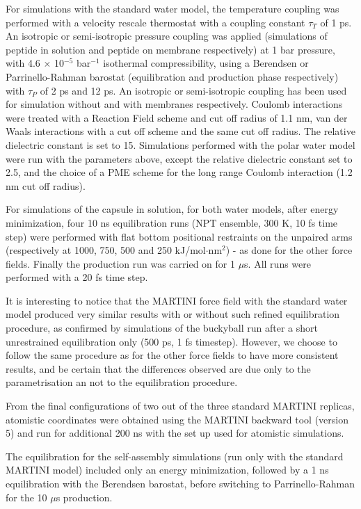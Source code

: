 For simulations with the standard water model, the temperature coupling was performed with a velocity rescale thermostat \citep{Bussi2007} with a coupling constant $\tau _T$ of 1 ps. An isotropic or semi-isotropic pressure coupling was applied (simulations of peptide in solution and peptide on membrane respectively) at 1 bar pressure, with 4.6 $\times$ 10$^{-5}$ bar$^{-1}$ isothermal compressibility, using a Berendsen \citep{Berendsen1984} or Parrinello-Rahman barostat \citep{Parrinello1981} (equilibration and production phase respectively) with $\tau _P$ of 2 ps and 12 ps. An isotropic or semi-isotropic coupling has been used for simulation without and with membranes respectively.
%
Coulomb interactions were treated with a Reaction Field scheme \citep{Tironi1995} and cut off radius of 1.1 nm, van der Waals interactions with a cut off scheme and the same cut off radius. The relative dielectric constant is set to 15.
%
Simulations performed with the polar water model were run with the parameters above, except the relative dielectric constant set to 2.5, and the choice of a PME scheme for the long range Coulomb interaction (1.2 nm cut off radius).

For simulations of the capsule in solution, for both water models, after energy minimization, four 10 ns equilibration runs (NPT ensemble, 300 K, 10 fs time step) were performed with flat bottom positional restraints on the unpaired arms (respectively at 1000, 750, 500 and 250 kJ/mol$\cdot$nm$^2$) - as done for the other force fields.
%
Finally the production run was carried on for 1 $\mu$s. All runs were performed with a 20 fs time step.

It is interesting to notice that the MARTINI force field with the standard water model produced very similar results with or without such refined equilibration procedure, as confirmed by simulations of the buckyball run after a short unrestrained equilibration only (500 ps, 1 fs timestep). However, we choose to follow the same procedure as for the other force fields to have more consistent results, and be certain that the differences observed are due only to the parametrisation an not to the equilibration procedure.

From the final configurations of two out of the three standard MARTINI replicas, atomistic coordinates were obtained using the MARTINI backward tool (version 5) \citep{Wassenaar2014} and run for additional 200 ns with the set up used for atomistic simulations.

The equilibration for the self-assembly simulations (run only with the standard MARTINI model) included only an energy minimization, followed by a 1 ns equilibration with the Berendsen barostat, before switching to Parrinello-Rahman for the 10 $\mu$s production.

